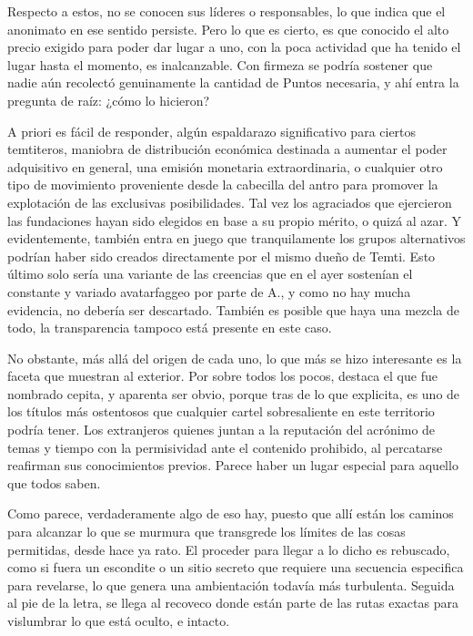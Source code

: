 \documentclass[
  spanish,
]{book}
\begin{document}
Respecto a estos, no se conocen sus líderes o responsables, lo que indica que el anonimato en ese sentido persiste. Pero lo que es cierto, es que conocido el alto precio exigido para poder dar lugar a uno, con la poca actividad que ha tenido el lugar hasta el momento, es inalcanzable. Con firmeza se podría sostener que nadie aún recolectó genuinamente la cantidad de Puntos necesaria, y ahí entra la pregunta de raíz: ¿cómo lo hicieron?

A priori es fácil de responder, algún espaldarazo significativo para ciertos temtiteros, maniobra de distribución económica destinada a aumentar el poder adquisitivo en general, una emisión monetaria extraordinaria, o cualquier otro tipo de movimiento proveniente desde la cabecilla del antro para promover la explotación de las exclusivas posibilidades. Tal vez los agraciados que ejercieron las fundaciones hayan sido elegidos en base a su propio mérito, o quizá al azar. Y evidentemente, también entra en juego que tranquilamente los grupos alternativos podrían haber sido creados directamente por el mismo dueño de Temti. Esto último solo sería una variante de las creencias que en el ayer sostenían el constante y variado avatarfaggeo por parte de A., y como no hay mucha evidencia, no debería ser descartado. También es posible que haya una mezcla de todo, la transparencia tampoco está presente en este caso.

No obstante, más allá del origen de cada uno, lo que más se hizo interesante es la faceta que muestran al exterior. Por sobre todos los pocos, destaca el que fue nombrado cepita, y aparenta ser obvio, porque tras de lo que explicita, es uno de los títulos más ostentosos que cualquier cartel sobresaliente en este territorio podría tener. Los extranjeros quienes juntan a la reputación del acrónimo de temas y tiempo con la permisividad ante el contenido prohibido, al percatarse reafirman sus conocimientos previos. Parece haber un lugar especial para aquello que todos saben.

Como parece, verdaderamente algo de eso hay, puesto que allí están los caminos para alcanzar lo que se murmura que transgrede los límites de las cosas permitidas, desde hace ya rato. El proceder para llegar a lo dicho es rebuscado, como si fuera un escondite o un sitio secreto que requiere una secuencia especifica para revelarse, lo que genera una ambientación todavía más turbulenta. Seguida al pie de la letra, se llega al recoveco donde están parte de las rutas exactas para vislumbrar lo que está oculto, e intacto.
\end{document}
